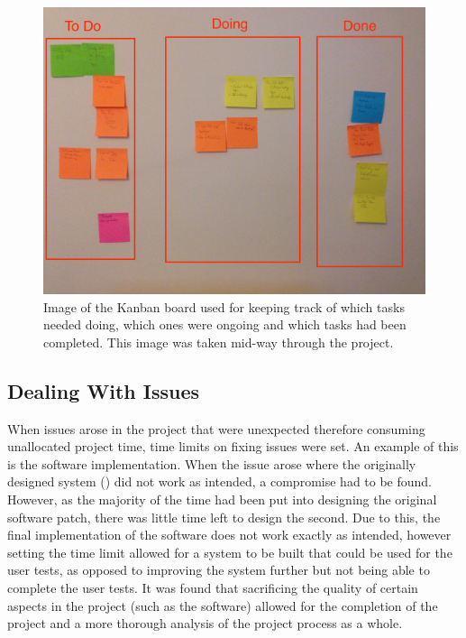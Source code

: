 \documentclass[../../main.tex]{subfiles}
\begin{document}
	\begin{center}
	\begin{figure}
		\centerline{\includegraphics[scale = 0.15]{Sections/ProjectManagement/images/kanban_edit.jpg}}
		\caption{Image of the Kanban board used for keeping track of which tasks needed doing, which ones were ongoing and which tasks had been completed. This image was taken mid-way through the project.}
		\label{kanban}
	\end{figure}
	\end{center}

	\subsection{Dealing With Issues}

		When issues arose in the project that were unexpected therefore consuming unallocated project time, time limits on fixing issues were set. An example of this is the software implementation. When the issue arose where the originally designed system () did not work as intended, a compromise had to be found. However, as the majority of the time had been put into designing the original software patch, there was little time left to design the second. Due to this, the final implementation of the software does not work exactly as intended, however setting the time limit allowed for a system to be built that could be used for the user tests, as opposed to improving the system further but not being able to complete the user tests. It was found that sacrificing the quality of certain aspects in the project (such as the software) allowed for the completion of the project and a more thorough analysis of the project process as a whole.

\end{document}

